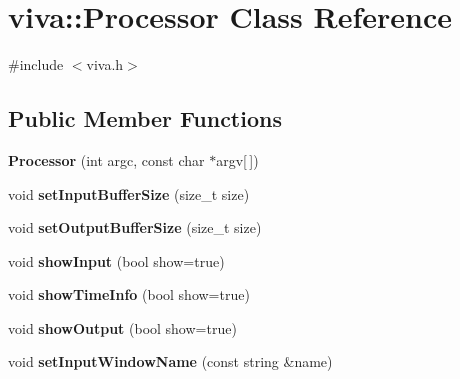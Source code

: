 \hypertarget{classviva_1_1_processor}{}\section{viva\+:\+:Processor Class Reference}
\label{classviva_1_1_processor}


{\ttfamily \#include $<$viva.\+h$>$}

\subsection*{Public Member Functions}
\begin{DoxyCompactItemize}
\item 
{\bfseries Processor} (int argc, const char $\ast$argv\mbox{[}$\,$\mbox{]})\hypertarget{classviva_1_1_processor_a353237f947a5441d3ca2fff1b5719b9d}{}\label{classviva_1_1_processor_a353237f947a5441d3ca2fff1b5719b9d}

\item 
void {\bfseries set\+Input\+Buffer\+Size} (size\+\_\+t size)\hypertarget{classviva_1_1_processor_a97dcc103d4fa72ea2de7949c816b959b}{}\label{classviva_1_1_processor_a97dcc103d4fa72ea2de7949c816b959b}

\item 
void {\bfseries set\+Output\+Buffer\+Size} (size\+\_\+t size)\hypertarget{classviva_1_1_processor_a21085a6e5c8bc297755ea50584624f2e}{}\label{classviva_1_1_processor_a21085a6e5c8bc297755ea50584624f2e}

\item 
void {\bfseries show\+Input} (bool show=true)\hypertarget{classviva_1_1_processor_a0856f185e561f03066755fd994892a9c}{}\label{classviva_1_1_processor_a0856f185e561f03066755fd994892a9c}

\item 
void {\bfseries show\+Time\+Info} (bool show=true)\hypertarget{classviva_1_1_processor_a5a5217ad1a90a00a26e991b161158e32}{}\label{classviva_1_1_processor_a5a5217ad1a90a00a26e991b161158e32}

\item 
void {\bfseries show\+Output} (bool show=true)\hypertarget{classviva_1_1_processor_ab6b872be8fae75cb1f70445d25f21481}{}\label{classviva_1_1_processor_ab6b872be8fae75cb1f70445d25f21481}

\item 
void {\bfseries set\+Input\+Window\+Name} (const string \&name)\hypertarget{classviva_1_1_processor_a1c7170ca5720762a5e4824215c10ed7e}{}\label{classviva_1_1_processor_a1c7170ca5720762a5e4824215c10ed7e}


\end{DoxyCompactItemize}
